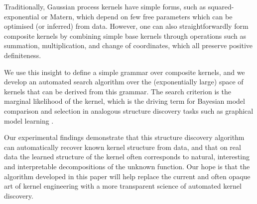 \documentclass[twoside]{article}
\begin{document}
Traditionally, Gaussian process kernels have simple forms, such as squared-exponential or Matern, which depend on few free parameters which can be optimised (or inferred) from data.
However, one can also straightforwardly form composite kernels by combining simple base kernels through operations such as summation, multiplication, and change of coordinates, which all preserve positive definiteness.

We use this insight to define a simple grammar over composite kernels, and we develop an automated search algorithm over the (exponentially large) space of kernels that can be derived from this grammar.
The search criterion is the marginal likelihood of the kernel, which is the driving term for Bayesian model comparison and selection in analogous structure discovery tasks such as graphical model learning \cite{heckerman1995learning}.


Our experimental findings demonstrate that this structure discovery algorithm can automatically recover known kernel structure from data, and that on real data the learned structure of the kernel often corresponds to natural, interesting and interpretable decompositions of the unknown function.
Our hope is that the algorithm developed in this paper will help replace the current and often opaque art of kernel engineering with a more transparent science of automated kernel discovery.
\end{document}
